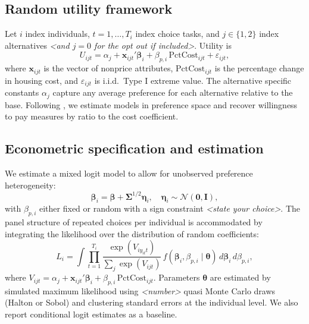 \documentclass[3p,11pt ]{elsarticle}
\begin{document}
\subsection{Random utility framework}
Let $i$ index individuals, $t = 1,\dots,T_i$ index choice tasks, and $j \in \{1,2\}$ index alternatives \textit{<and $j=0$ for the opt out if included>}. Utility is
\begin{equation}
U_{ijt} = \alpha_j + \mathbf{x}_{ijt}' \boldsymbol{\beta}_i + \beta_{p,i} \, \text{PctCost}_{ijt} + \varepsilon_{ijt},
\end{equation}
where $\mathbf{x}_{ijt}$ is the vector of nonprice attributes, $\text{PctCost}_{ijt}$ is the percentage change in housing cost, and $\varepsilon_{ijt}$ is i.i.d.\ Type I extreme value. The alternative specific constants $\alpha_j$ capture any average preference for each alternative relative to the base. Following \citet{Caplan2021}, we estimate models in preference space and recover willingness to pay measures by ratio to the cost coefficient.

\subsection{Econometric specification and estimation}
We estimate a mixed logit model to allow for unobserved preference heterogeneity:
\begin{equation}
\boldsymbol{\beta}_i = \boldsymbol{\beta} + \mathbf{\Sigma}^{1/2} \mathbf{\eta}_i, \quad \mathbf{\eta}_i \sim \mathcal{N}(\mathbf{0}, \mathbf{I}),
\end{equation}
with $\beta_{p,i}$ either fixed or random with a sign constraint \textit{<state your choice>}. The panel structure of repeated choices per individual is accommodated by integrating the likelihood over the distribution of random coefficients:
\begin{equation}
L_i = \int \prod_{t=1}^{T_i} \frac{\exp\left( V_{i y_{it} t} \right)}{\sum_{j} \exp\left( V_{ijt} \right)} \, f(\boldsymbol{\beta}_i, \beta_{p,i} \mid \boldsymbol{\theta}) \, d\boldsymbol{\beta}_i \, d\beta_{p,i},
\end{equation}
where $V_{ijt} = \alpha_j + \mathbf{x}_{ijt}' \boldsymbol{\beta}_i + \beta_{p,i} \, \text{PctCost}_{ijt}$. Parameters $\boldsymbol{\theta}$ are estimated by simulated maximum likelihood using \textit{<number>} quasi Monte Carlo draws (Halton or Sobol) and clustering standard errors at the individual level. We also report conditional logit estimates as a baseline.
\end{document}
